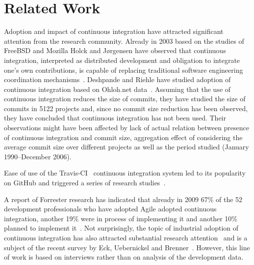 \section{Related Work}
\label{sec:rw}
Adoption and impact of continuous integration have attracted significant attention from the research community. Already in 2003 based on the studies of FreeBSD and Mozilla Holck and J{\o}rgensen have observed that continuous integration, interpreted as distributed development and obligation to integrate one's own contributions, is capable of replacing traditional software engineering coordination mechanisms~\cite{HolckJ03}.  
Deshpande and Riehle have studied adoption of continuous integration based on Ohloh.net data~\cite{Deshpande2008}. Assuming that the use of continuous integration reduces the size of commits, they have studied the size of commits in 5122 projects and, since no commit size reduction has been observed, they have concluded that continuous integration has not been used. Their observations might have been affected by lack of actual relation between presence of continuous integration and commit size, aggregation effect of considering the average commit size over different projects as well as the period studied (January 1990--December 2006). 

Ease of use of the Travis-CI~\cite{TravisCI} continuous integration system led to its popularity on GitHub and triggered a series of research studies~\cite{era14,VasilescuYWDF15,yue2015wait,BellerGZ16,Hilton2016,Yu2016}.

A report of Forrester research has indicated that already in 2009 67\% of the 52 development professionals who have adopted Agile adopted continuous integration, another 19\% were in process of implementing it and another 10\% planned to implement it~\cite{Forrester}. 
Not surprisingly, the topic of industrial adoption of continuous integration 
has also attracted substantial research attention~\cite{Leppanen2015,Laukkanen2015Agile,Debbiche2014,Stahl2014ICSEComp,Stahl2014JSS} and is a subject of the recent survey by Eck, Uebernickel and Brenner~\cite{EckUB14}. 
However, this line of work is based on interviews rather than on analysis of the development data.


